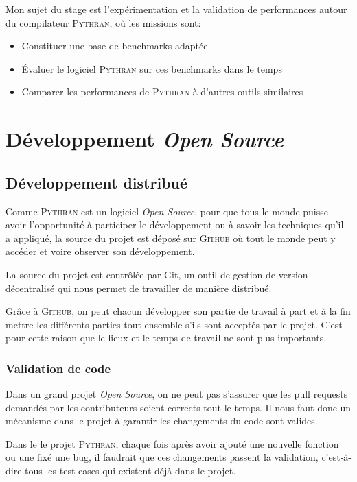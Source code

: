 \documentclass[a4paper, 11pt]{article}
\newcommand\Pythran{\textsc{Pythran}}
\newcommand\Github{\textsc{Github}}
\begin{document}
Mon sujet du stage est l'expérimentation et la validation de performances
autour du compilateur \Pythran{}, où les missions sont:

  \begin{itemize}
    \item Constituer une base de benchmarks adaptée
    \item Évaluer le logiciel \Pythran{} sur ces benchmarks dans le temps
    \item Comparer les performances de \Pythran{} à d'autres outils similaires
  \end{itemize}


\section{Développement \emph{Open Source}}
\label{sec:developpement-open-source}

\subsection*{Développement distribué}

Comme \Pythran{} est un logiciel \emph{Open Source}, pour que tous le monde puisse
avoir l'opportunité à participer le développement ou à savoir les techniques
qu'il a appliqué, la source du projet est déposé sur \Github{} où tout le monde peut
y accéder et voire observer son développement.

La source du projet est contrôlée par Git, un outil de gestion de version
décentralisé qui nous permet de travailler de manière distribué.

Grâce à \Github{}, on peut chacun développer son partie de travail à part et à
la fin mettre les différents parties tout ensemble s'ils sont acceptés par le
projet. C'est pour cette raison que le lieux et le temps de travail ne sont plus
importants.

\subsubsection*{Validation de code}
Dans un grand projet \emph{Open Source}, on ne peut pas s'assurer que les pull
requests demandés par les contributeurs soient corrects tout le temps. Il nous
faut donc un mécanisme dans le projet à garantir les changements du code sont
valides.

Dans le le projet \Pythran{}, chaque fois après avoir ajouté une nouvelle fonction ou
une fixé une bug, il faudrait que ces changements passent la validation,
c'est-à-dire tous les test cases qui existent déjà dans le projet.
\end{document}
